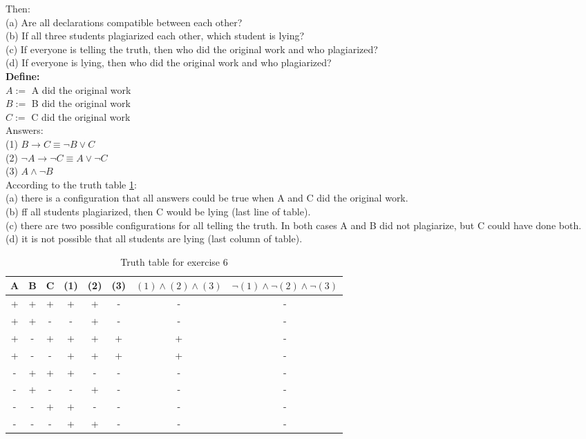 \documentclass[paper=a4, fontsize=11pt]{scrartcl} %
\numberwithin{equation}{section} %
\numberwithin{figure}{section} %
\numberwithin{table}{section} %
\begin{document}
Then:\\
(a) Are all declarations compatible between each other?\\
(b) If all three students plagiarized each other, which student is lying?\\
(c) If everyone is telling the truth, then who did the original work and who plagiarized?\\
(d) If everyone is lying, then who did the original work and who plagiarized?\\

\textbf{Define:}\\
$A:=$ A did the original work\\
$B:=$ B did the original work\\
$C:=$ C did the original work\\

Answers:\\
(1) $B\to C\equiv\neg B\lor C$\\
(2) $\neg A\to\neg C\equiv A\lor\neg C$\\
(3) $A\land\neg B$\\

According to the truth table \ref{tab:ex6}:\\
(a) there is a configuration that all answers could be true when A and C did the original work. \\
(b) ff all students plagiarized, then C would be lying (last line of table).\\
(c) there are two possible configurations for all telling the truth. In both cases A and B did not plagiarize, but C could have done both. \\
(d) it is not possible that all students are lying (last column of table).

\begin{table}[h]
\begin{tabular}{|c|c|c|c|c|c|c|c|}
\hline
A&B&C&(1)&(2)&(3)&$(1)\land (2)\land (3)$&$\neg (1)\land\neg (2)\land\neg (3)$\\
\hline
+&+&+&+&+&-&-&-\\
+&+&-&-&+&-&-&-\\
+&-&+&+&+&+&+&-\\
+&-&-&+&+&+&+&-\\
-&+&+&+&-&-&-&-\\
-&+&-&-&+&-&-&-\\
-&-&+&+&-&-&-&-\\
-&-&-&+&+&-&-&-\\

\hline
\end{tabular}
\caption{Truth table for exercise 6}
\label{tab:ex6}
\end{table}
\end{document}
